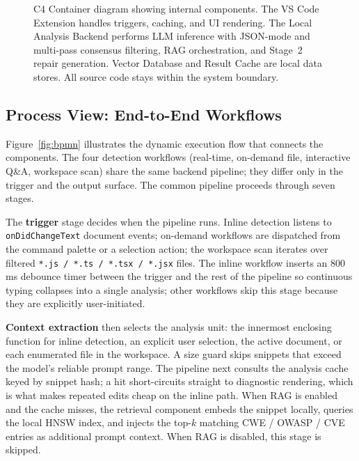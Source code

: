 \begin{figure}
  \centering
  \caption[C4 Container diagram for Code Guardian.]{C4 Container diagram showing internal components. The VS Code Extension handles triggers, caching, and UI rendering. The Local Analysis Backend performs LLM inference with JSON-mode and multi-pass consensus filtering, RAG orchestration, and Stage~2 repair generation. Vector Database and Result Cache are local data stores. All source code stays within the system boundary.}
  \label{fig:c4-container}
\end{figure}

\FloatBarrier

\subsection{Process View: End-to-End Workflows}
\label{subsec:process-view}

Figure~\ref{fig:bpmn} illustrates the dynamic execution flow that connects the components. The four detection workflows (real-time, on-demand file, interactive Q\&A, workspace scan) share the same backend pipeline; they differ only in the trigger and the output surface. The common pipeline proceeds through seven stages.

The \textbf{trigger} stage decides when the pipeline runs. Inline detection listens to \texttt{onDidChangeText} document events; on-demand workflows are dispatched from the command palette or a selection action; the workspace scan iterates over filtered \texttt{*.js / *.ts / *.tsx / *.jsx} files. The inline workflow inserts an 800\,ms debounce timer between the trigger and the rest of the pipeline so continuous typing collapses into a single analysis; other workflows skip this stage because they are explicitly user-initiated.

\textbf{Context extraction} then selects the analysis unit: the innermost enclosing function for inline detection, an explicit user selection, the active document, or each enumerated file in the workspace. A size guard skips snippets that exceed the model's reliable prompt range. The pipeline next consults the analysis cache keyed by snippet hash; a hit short-circuits straight to diagnostic rendering, which is what makes repeated edits cheap on the inline path. When RAG is enabled and the cache misses, the retrieval component embeds the snippet locally, queries the local HNSW index, and injects the top-$k$ matching CWE / OWASP / CVE entries as additional prompt context. When RAG is disabled, this stage is skipped.

